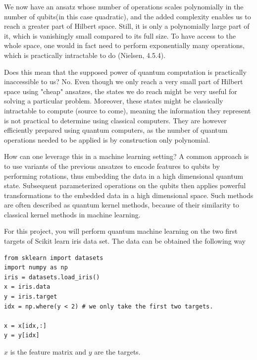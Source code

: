 \documentclass[%
oneside,                 %
final,                   %
10pt]{article}
\begin{document}
We now have an ansatz whose number of operations scales polynomially in the number of qubits(in this case quadratic), and the
added complexity enables us to reach a greater part of Hilbert space. Still, it is only a polynomially large part of it, which
is vanishingly small compared to its full size. To have access to the whole space, one would in fact need to perform exponentially
many operations, which is practically intractable to do (Nielsen, 4.5.4).

Does this mean that the supposed power of quantum computation is practically inaccessible to us? No. Even though we
only reach a very small part of Hilbert space using "cheap" ansatzes, the states we do reach might be very useful
for solving a particular problem. Moreover, these states might be classically intractable to compute (source to come),
meaning the information they represent is not practical to determine using classical computers. They are however efficiently
prepared using quantum computers, as the number of quantum operations needed to be applied is by construction only polynomial.

How can one leverage this in a machine learning setting? A common approach is to use variants of the previous ansatzes to encode features to qubits by performing rotations, thus embedding the data in a high dimensional quantum state. Subsequent parameterized operations on the qubits then applies powerful transformations to the embedded data in a high dimensional space. Such methods are often described as quantum kernel methods, because of their similarity to classical kernel methods in machine learning.

For this project, you will perform quantum machine learning on the two first targets of Scikit learn iris data set. The data can be obtained the following way











\begin{verbatim}
from sklearn import datasets
import numpy as np
iris = datasets.load_iris()
x = iris.data
y = iris.target
idx = np.where(y < 2) # we only take the first two targets.

x = x[idx,:]
y = y[idx]

\end{verbatim}

$x$ is the feature matrix and $y$ are the targets.
\end{document}
